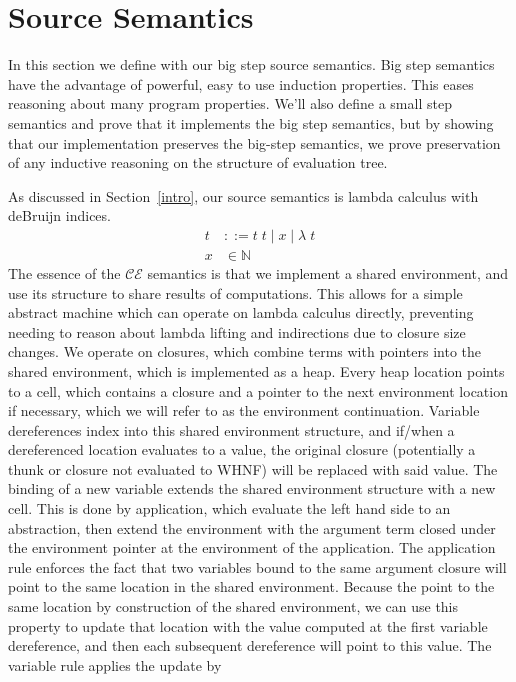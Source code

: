 \section{Source Semantics} \label{cem_big}

In this section we define with our big step source semantics. Big step semantics
have the advantage of powerful, easy to use induction properties. This eases
reasoning about many program properties. We'll also define a small step
semantics and prove that it implements the big step semantics, but by showing
that our implementation preserves the big-step semantics, we prove preservation
of any inductive reasoning on the structure of evaluation tree.  

As discussed in Section~\ref{intro}, our source semantics is lambda calculus
with deBruijn indices.  \begin{align*}
 t &::= t \; t \; | \; x \; | \;  \lambda \; t \\
 x &\in \mathbb{N}
\end{align*}
The essence of the $\mathcal{CE}$ semantics is that we implement a shared
environment, and use its structure to share results of computations. This allows
for a simple abstract machine which can operate on lambda calculus directly,
preventing needing to reason about lambda lifting and indirections due to
closure size changes. We operate on closures, which combine terms with
pointers into the shared environment, which is implemented as a heap. Every
heap location points to a cell, which contains a closure and a pointer to the
next environment location if necessary, which we will refer to as the
environment continuation. Variable dereferences index into this shared
environment structure, and if/when a dereferenced location evaluates to a value,
the original closure (potentially a thunk or closure not evaluated to WHNF) will
be replaced with said value. The binding of a new variable extends the shared
environment structure with a new cell. This is done by application, which
evaluate the left hand side to an abstraction, then extend the environment with
the argument term closed under the environment pointer at the environment of the
application. The application rule enforces the fact that two variables bound to
the same argument closure will point to the same location in the shared
environment. Because the point to the same location by construction of the
shared environment, we can use this property to update that location with the
value computed at the first variable dereference, and then each subsequent
dereference will point to this value. The variable rule applies the update by
